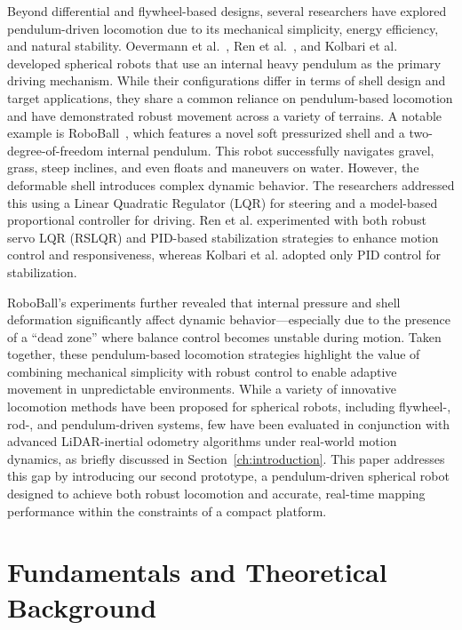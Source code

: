 \documentclass[english, bachelor, utf8]{base/thesis_telematics}
\begin{document}
Beyond differential and flywheel-based designs, several researchers have explored pendulum-driven locomotion due to its mechanical simplicity, energy efficiency, and natural stability. 
Oevermann et al.~\cite{roboball}, Ren et al.~\cite{novelsphere}, and Kolbari et al.~\cite{pendulum_sphere} developed spherical robots that use an internal heavy pendulum as the primary driving mechanism. 
While their configurations differ in terms of shell design and target applications, they share a common reliance on pendulum-based locomotion and have demonstrated robust movement across a variety of terrains.
A notable example is RoboBall~\cite{roboball}, which features a novel soft pressurized shell and a two-degree-of-freedom internal pendulum. 
This robot successfully navigates gravel, grass, steep inclines, and even floats and maneuvers on water. 
However, the deformable shell introduces complex dynamic behavior. 
The researchers addressed this using a Linear Quadratic Regulator (LQR) for steering and a model-based proportional controller for driving. 
Ren et al. \cite{novelsphere} experimented with both robust servo LQR (RSLQR) and PID-based stabilization strategies to enhance motion control and responsiveness, whereas Kolbari et al. \cite{pendulum_sphere} adopted only PID control for stabilization. 

RoboBall’s experiments further revealed that internal pressure and shell deformation significantly affect dynamic behavior—especially due to the presence of a ``dead zone'' where balance control becomes unstable during motion.
Taken together, these pendulum-based locomotion strategies highlight the value of combining mechanical simplicity with robust control to enable adaptive movement in unpredictable environments.
While a variety of innovative locomotion methods have been proposed for spherical robots, including flywheel-, rod-, and pendulum-driven systems, few have been evaluated in conjunction with advanced LiDAR-inertial odometry algorithms under real-world motion dynamics, as briefly discussed in Section~\ref{ch:introduction}.
This paper addresses this gap by introducing our second prototype, a pendulum-driven spherical robot designed to achieve both robust locomotion and accurate, real-time mapping performance within the constraints of a compact platform.

\chapter{Fundamentals and Theoretical Background}
\label{ch:fundamentals}
\end{document}
